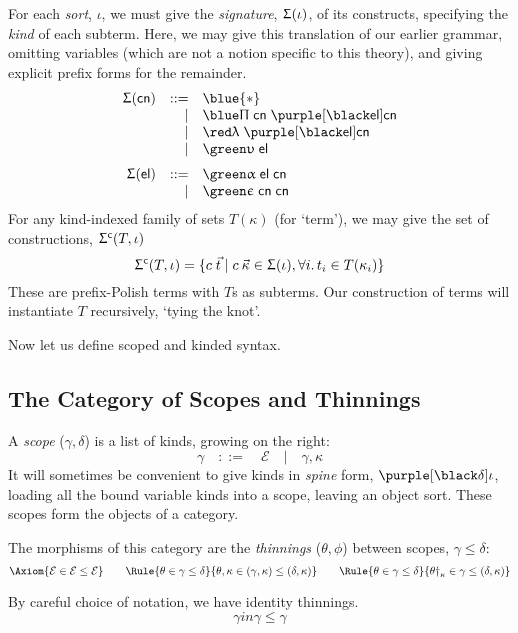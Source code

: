 \documentclass[natbib]{article}
\newcommand{\type}{\blue{\ast}}
\newcommand{\EC}{\mathcal{E}}
\begin{document}
\newcommand{\Sg}{\Upsigma}
For each \emph{sort}, $\iota$, we must give the \emph{signature}, $\Sg(\iota)$, of its constructs, specifying the \emph{kind} of each subterm. Here, we may give this translation of our earlier grammar, omitting variables (which are not a notion specific to this theory), and giving explicit prefix forms for the remainder.
\[\begin{array}{rrl}
\Sg(\cns) & ::= & \type \\
          &   | & \pic\; \cns\; \bnd\elm\cns \\
          &   | & \lac\; \bnd\elm\cns \\
          &   | & \elc\;\elm \medskip \\
\Sg(\elm) & ::= & \apc\;\elm\;\cns \\
          &   | & \tyc\;\cns\;\cns
\end{array}\]
\newcommand{\Sgc}[2]{\Sg^{\mathsf{c}}(#1,#2)}
For any kind-indexed family of sets $T(\kappa)$ (for `term'), we may give the set of constructions, $\Sgc T\iota$
\[
  \Sgc T\iota = \{c\;\vec{t} \;|\; c\:\vec{\kappa}\in \Sg(\iota), \forall i.\,t_i\in T(\kappa_i)\}
\]
These are prefix-Polish terms with $T$s as subterms. Our construction of terms will instantiate $T$ recursively,
`tying the knot'.

Now let us define scoped and kinded syntax.

\subsection{The Category of Scopes and Thinnings}

A \emph{scope} ($\gamma, \delta$) is a list of kinds, growing on the right:
\[
\gamma \quad::=\quad \EC \quad|\quad \gamma,\kappa
\]
It will sometimes be convenient to give kinds in \emph{spine} form, $\bnd\delta\iota$, loading all the bound variable kinds into a scope, leaving an object sort. These scopes form the objects of a category.

The morphisms of this category are the \emph{thinnings} ($\theta, \phi$) between scopes, $\gamma\le\delta$:
\[
\Axiom{\EC \in \EC\le\EC}
\qquad
\Rule{\theta \in \gamma\le\delta}
     {\theta,\kappa \in (\gamma,\kappa)\le(\delta,\kappa)}
\qquad
\Rule{\theta \in \gamma\le\delta}
     {\theta\dag_\kappa \in \gamma\le(\delta,\kappa)}
\]

By careful choice of notation, we have identity thinnings.
\[
\gamma in \gamma\le\gamma
\]
\end{document}
